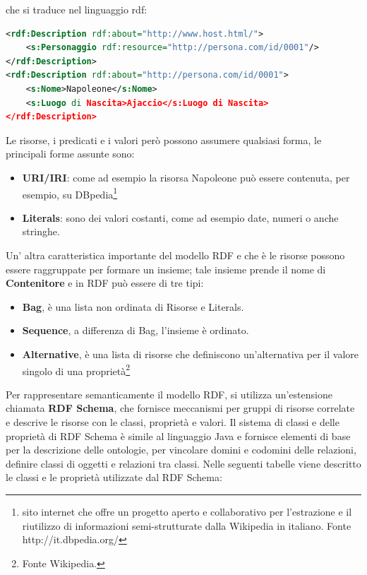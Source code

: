 \documentclass[a4paper,11pt]{article}
\begin{document}
\begin{enumerate}
\begin{enumerate}[label*=\arabic*.]
che si traduce nel linguaggio rdf:
\begin{lstlisting}[language=XML, basicstyle=\large]
<rdf:Description rdf:about="http://www.host.html/">
	<s:Personaggio rdf:resource="http://persona.com/id/0001"/>
</rdf:Description>
<rdf:Description rdf:about="http://persona.com/id/0001">
 	<s:Nome>Napoleone</s:Nome>
 	<s:Luogo di Nascita>Ajaccio</s:Luogo di Nascita>
</rdf:Description>

\end{lstlisting}

Le risorse, i predicati e i valori però possono assumere qualsiasi forma, le principali forme assunte sono:
			\begin{itemize}
				\item \textbf{URI/IRI}: come ad esempio la risorsa Napoleone può essere contenuta, per esempio, su DBpedia\footnote{ sito internet che offre un progetto aperto e collaborativo per l’estrazione e il riutilizzo di informazioni semi-strutturate dalla Wikipedia in italiano. Fonte http://it.dbpedia.org/}
				\item \textbf{Literals}: sono dei valori costanti, come ad esempio date, numeri o anche stringhe.
			\end{itemize}

Un' altra caratteristica importante del modello RDF e che è le risorse possono essere raggruppate per formare un insieme; tale insieme prende il nome di \textbf{Contenitore} e in RDF può essere di tre tipi:
			\begin{itemize}
				\item \textbf{Bag}, è una lista non ordinata di Risorse e Literals.
				\item \textbf{Sequence}, a differenza di Bag, l'insieme è ordinato.
				\item \textbf{Alternative}, è una lista di risorse che definiscono un'alternativa per il valore singolo di una proprietà\footnote{Fonte Wikipedia.}
			\end{itemize}\newpage		
Per rappresentare semanticamente il modello RDF, si utilizza un'estensione chiamata \textbf{RDF Schema}, che fornisce meccanismi per gruppi di risorse correlate e descrive le risorse con le classi, proprietà e valori. Il sistema di classi e delle proprietà di RDF Schema è simile al linguaggio Java e fornisce elementi di base per la descrizione delle ontologie, per vincolare domini e codomini delle relazioni, definire classi di oggetti e relazioni tra classi.
Nelle seguenti tabelle viene descritto le classi e le proprietà utilizzate dal RDF Schema:	\newline
		

\end{enumerate}
\end{enumerate}
\end{document}
